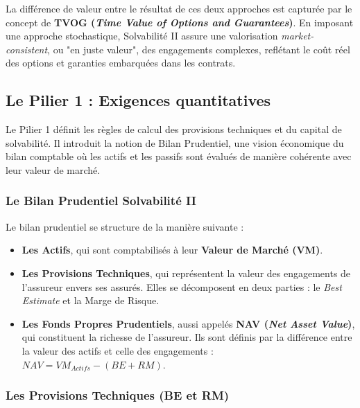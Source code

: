 La différence de valeur entre le résultat de ces deux approches est capturée par le concept de \textbf{TVOG (\textit{Time Value of Options and Guarantees})}. En imposant une approche stochastique, Solvabilité II assure une valorisation \textit{market-consistent}, ou "en juste valeur", des engagements complexes, reflétant le coût réel des options et garanties embarquées dans les contrats.
\subsection{Le Pilier 1 : Exigences quantitatives}

Le Pilier 1 définit les règles de calcul des provisions techniques et du capital de solvabilité. Il introduit la notion de Bilan Prudentiel, une vision économique du bilan comptable où les actifs et les passifs sont évalués de manière cohérente avec leur valeur de marché.

\subsubsection{Le Bilan Prudentiel Solvabilité II}

Le bilan prudentiel se structure de la manière suivante :
\begin{itemize}
    \item \textbf{Les Actifs}, qui sont comptabilisés à leur \textbf{Valeur de Marché (VM)}.
    \item \textbf{Les Provisions Techniques}, qui représentent la valeur des engagements de l'assureur envers ses assurés. Elles se décomposent en deux parties : le \textit{Best Estimate} et la Marge de Risque.
    \item \textbf{Les Fonds Propres Prudentiels}, aussi appelés \textbf{NAV (\textit{Net Asset Value})}, qui constituent la richesse de l'assureur. Ils sont définis par la différence entre la valeur des actifs et celle des engagements : $NAV = VM_{Actifs} - (BE + RM)$.
\end{itemize}

\subsubsection{Les Provisions Techniques (BE et RM)}

